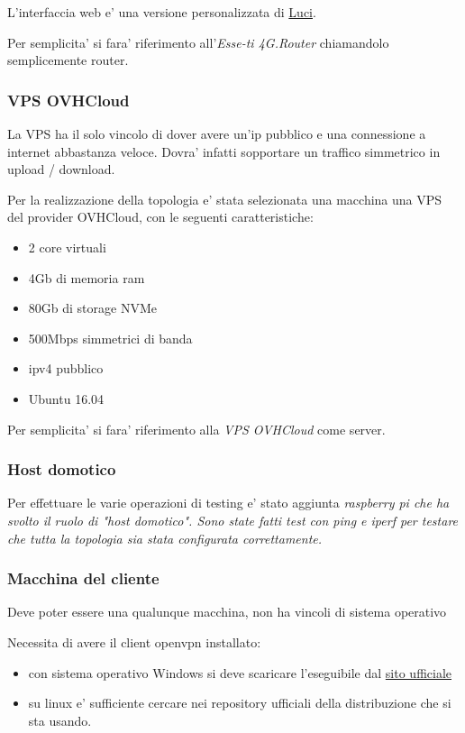 L'interfaccia web e' una versione personalizzata di \href{https://openwrt.org/docs/guide-user/luci/start}{Luci}.

Per semplicita' si fara' riferimento all'\textit{Esse-ti 4G.Router} chiamandolo semplicemente router.

\subsubsection{VPS OVHCloud}

La VPS ha il solo vincolo di dover avere un'ip pubblico e una connessione a internet abbastanza veloce. Dovra' infatti sopportare un traffico simmetrico in upload / download.

Per la realizzazione della topologia e' stata selezionata una macchina una VPS del provider OVHCloud, con le seguenti caratteristiche:

\begin{itemize}
	\item 2 core virtuali
	\item 4Gb di memoria ram
	\item 80Gb di storage NVMe
	\item 500Mbps simmetrici di banda
	\item ipv4 pubblico
	\item Ubuntu 16.04
\end{itemize}

Per semplicita' si fara' riferimento alla \textit{VPS OVHCloud} come server.

\subsubsection{Host domotico}

Per effettuare le varie operazioni di testing e' stato aggiunta \it{raspberry pi} che ha svolto il ruolo di "host domotico". Sono state fatti test con ping e iperf per testare che tutta la topologia sia stata configurata correttamente.


\subsubsection{Macchina del cliente}

Deve poter essere una qualunque macchina, non ha vincoli di sistema operativo

Necessita di avere il client openvpn installato:

\begin{itemize}
	\item con sistema operativo Windows si deve scaricare l'eseguibile dal \href{https://openvpn.net/client-connect-vpn-for-windows/}{sito ufficiale}
	\item su linux e' sufficiente cercare nei repository ufficiali della distribuzione che si sta usando.
\end{itemize}



